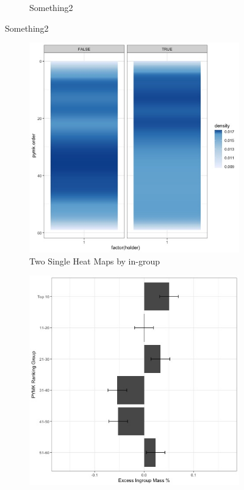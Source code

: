 \documentclass[12pt,letterpaper]{article}
\begin{document}
\begin{figure}[ht]
\begin{subfigure}{.5\textwidth}
        \caption{Something2}
        \label{fig:nf_rankingboost_india}
    \end{subfigure}
\end{figure}

\begin{figure}[ht]
\caption{PYMK in-group Posts Not Higher}
\label{fig:pymk_bygroup_india}
    \begin{subfigure}{.5\textwidth} 
        \centering
        \includegraphics[width=1\linewidth]{Output/Graphs/Audit/Heatmaps/India PYMK pymk rank by ingroup - smooth.jpg}  
        \caption{Two Single Heat Maps by in-group}
        \label{fig:pymk_bygroup_hm_india}
        \end{subfigure}
    \begin{subfigure}{.5\textwidth}
        \centering
        \includegraphics[width=.9\linewidth]{Output/Graphs/Audit/Excess Mass/India PYMK excess mass by ranking group.jpg}  

\end{subfigure}
\end{figure}
\end{document}
